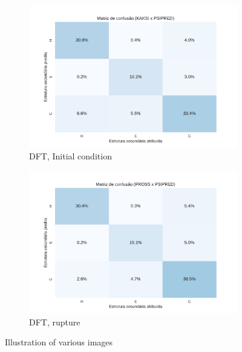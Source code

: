 \begin{figure}[ht]
\begin{subfigure}[b]{0.5\linewidth}
      \includegraphics[width=1.0\linewidth]{../figures/psipred_kaksi_confusion_matrix.pdf} 
      \caption{DFT, Initial condition} 
      \label{fig7:c} 
    \end{subfigure}%
    \begin{subfigure}[b]{0.5\linewidth}
      \centering
      \includegraphics[width=1.0\linewidth]{../figures/psipred_pross_confusion_matrix.pdf} 
      \caption{DFT, rupture} 
      \label{fig7:d} 
    \end{subfigure} 
    \caption{Illustration of various images}
    \label{fig7} 
  \end{figure}